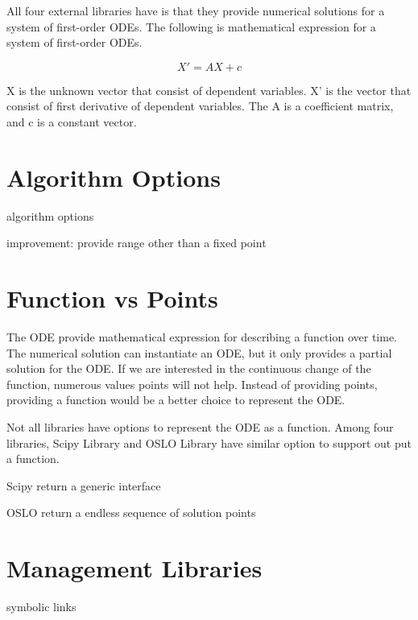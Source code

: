 All four external libraries have is that they provide numerical solutions for a system of first-order ODEs. The following is mathematical expression for a system of first-order ODEs. 

\begin{equation} \label{eq_foode}
    X' = AX + c
\end{equation}

X is the unknown vector that consist of dependent variables. X' is the vector that consist of first derivative of dependent variables. The A is a coefficient matrix, and c is a constant vector. 


\section{Algorithm Options}
algorithm options

improvement: provide range other than a fixed point 

\section{Function vs Points}
The ODE provide mathematical expression for describing a function over time. The numerical solution can instantiate an ODE, but it only provides a partial solution for the ODE. If we are interested in the continuous change of the function, numerous values points will not help. Instead of providing points, providing a function would be a better choice to represent the ODE.

Not all libraries have options to represent the ODE as a function. Among four libraries, Scipy Library and OSLO Library have similar option to support out put a function.

Scipy
return a generic interface

OSLO
return a endless sequence of solution points


\section{Management Libraries}
symbolic links